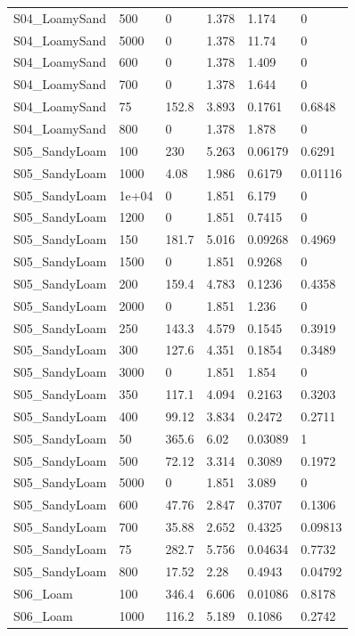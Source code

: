 {\begin{longtable}
{}S04\_LoamySand & 500 & 0 & 1.378 & 1.174 & 0\\
{}S04\_LoamySand & 5000 & 0 & 1.378 & 11.74 & 0\\
{}S04\_LoamySand & 600 & 0 & 1.378 & 1.409 & 0\\
{}S04\_LoamySand & 700 & 0 & 1.378 & 1.644 & 0\\
{}S04\_LoamySand & 75 & 152.8 & 3.893 & 0.1761 & 0.6848\\
{}S04\_LoamySand & 800 & 0 & 1.378 & 1.878 & 0\\
{}S05\_SandyLoam & 100 & 230 & 5.263 & 0.06179 & 0.6291\\
{}S05\_SandyLoam & 1000 & 4.08 & 1.986 & 0.6179 & 0.01116\\
{}S05\_SandyLoam & 1e+04 & 0 & 1.851 & 6.179 & 0\\
{}S05\_SandyLoam & 1200 & 0 & 1.851 & 0.7415 & 0\\
{}S05\_SandyLoam & 150 & 181.7 & 5.016 & 0.09268 & 0.4969\\
{}S05\_SandyLoam & 1500 & 0 & 1.851 & 0.9268 & 0\\
{}S05\_SandyLoam & 200 & 159.4 & 4.783 & 0.1236 & 0.4358\\
{}S05\_SandyLoam & 2000 & 0 & 1.851 & 1.236 & 0\\
{}S05\_SandyLoam & 250 & 143.3 & 4.579 & 0.1545 & 0.3919\\
{}S05\_SandyLoam & 300 & 127.6 & 4.351 & 0.1854 & 0.3489\\
{}S05\_SandyLoam & 3000 & 0 & 1.851 & 1.854 & 0\\
{}S05\_SandyLoam & 350 & 117.1 & 4.094 & 0.2163 & 0.3203\\
{}S05\_SandyLoam & 400 & 99.12 & 3.834 & 0.2472 & 0.2711\\
{}S05\_SandyLoam & 50 & 365.6 & 6.02 & 0.03089 & 1\\
{}S05\_SandyLoam & 500 & 72.12 & 3.314 & 0.3089 & 0.1972\\
{}S05\_SandyLoam & 5000 & 0 & 1.851 & 3.089 & 0\\
{}S05\_SandyLoam & 600 & 47.76 & 2.847 & 0.3707 & 0.1306\\
{}S05\_SandyLoam & 700 & 35.88 & 2.652 & 0.4325 & 0.09813\\
{}S05\_SandyLoam & 75 & 282.7 & 5.756 & 0.04634 & 0.7732\\
{}S05\_SandyLoam & 800 & 17.52 & 2.28 & 0.4943 & 0.04792\\
{}S06\_Loam & 100 & 346.4 & 6.606 & 0.01086 & 0.8178\\
{}S06\_Loam & 1000 & 116.2 & 5.189 & 0.1086 & 0.2742\\

\end{longtable}}
